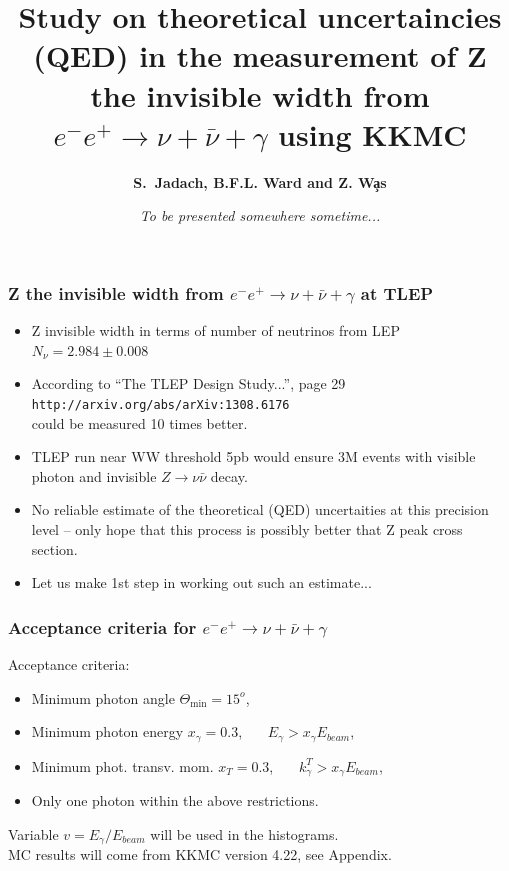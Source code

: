 \documentclass{beamer}
\title[Monte Carlo Methods] %
{ {\bf Study on theoretical uncertaincies (QED) in the measurement
  of Z the invisible width from 
  $e^-e^+\to\nu+\bar\nu+\gamma$ using KKMC}
} %
\author[S.~Jadach] %
{\bf S.~Jadach,  B.F.L. Ward and Z. W\c{a}s}
\institute[Universities of Somewhere and Elsewhere] %
{ {\large\crd IFJ-PAN, Krak\'ow, Poland}\\
  {~~~}\\
  {\footnotesize
  Partly supported by Polish Government grant\\
  {\em Narodowe Centrum Nauki} DEC-2011/03/B/ST2/02632
}}
\date[Short Occasion] %
{\em To be presented somewhere sometime...
}
\begin{document}
\begin{frame}
  \titlepage
\end{frame}

\begin{frame}[fragile]
\frametitle{\bf Z the invisible width from 
  $e^-e^+\to\nu+\bar\nu+\gamma$ at TLEP}
\small
\begin{itemize}
\item
Z invisible width in terms of number of neutrinos from LEP
$N_\nu = 2.984\pm0.008$
\item
According to ``The TLEP Design Study...'', page 29
{\tt http://arxiv.org/abs/arXiv:1308.6176}\\
could be measured 10 times better.
\item
TLEP run near WW threshold 5pb would ensure 3M events
with visible photon and invisible $Z\to \nu\bar\nu$ decay.
\item
No reliable estimate of the theoretical
(QED) uncertaities at this precision level --
only hope that this process is possibly 
better that Z peak cross section.
\item
Let us make 1st step in working out such an estimate...
\end{itemize}
\end{frame}

\begin{frame}[fragile]
\frametitle{\bf Acceptance criteria for $e^-e^+\to\nu+\bar\nu+\gamma$}
Acceptance criteria:
\begin{itemize}
\item
Minimum photon angle $\Theta_{\min}=15^o$,
\item
Minimum photon energy $x_\gamma=0.3$, ~~~$E_\gamma > x_\gamma E_{beam}$,
\item
Minimum phot. transv. mom. $x_T=0.3$, ~~~$k^T_\gamma > x_\gamma E_{beam}$,
\item
Only one photon within the above restrictions.
\end{itemize}
Variable $v=E_\gamma/E_{beam}$ will be used in the histograms.\\
MC results will come from KKMC version 4.22, see Appendix.

\end{frame}
\end{document}
